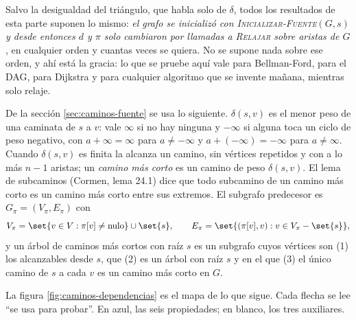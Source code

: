 \documentclass[11pt,letterpaper]{article}
\begin{document}
Salvo la desigualdad del triángulo, que habla solo de $\delta$, todos
los resultados de esta parte suponen lo mismo: \emph{el grafo se
inicializó con \textsc{Inicializar-Fuente}$(G, s)$ y desde entonces
$d$ y $\pi$ solo cambiaron por llamadas a \textsc{Relajar} sobre
aristas de $G$}, en cualquier orden y cuantas veces se quiera. No se
supone nada sobre ese orden, y ahí está la gracia: lo que se pruebe
aquí vale para Bellman-Ford, para el DAG, para Dijkstra y para
cualquier algoritmo que se invente mañana, mientras solo relaje.

De la sección \ref{sec:caminos-fuente} se usa lo siguiente.
$\delta(s, v)$ es el menor peso de una caminata de $s$ a $v$: vale
$\infty$ si no hay ninguna y $-\infty$ si alguna toca un ciclo de peso
negativo, con $a + \infty = \infty$ para $a \ne -\infty$ y
$a + (-\infty) = -\infty$ para $a \ne \infty$. Cuando $\delta(s, v)$ es
finita la alcanza un camino, sin vértices repetidos y con a lo más
$n - 1$ aristas; un \emph{camino más corto} es un camino de peso
$\delta(s, v)$. El lema de subcaminos (Cormen, lema 24.1) dice que todo
subcamino de un camino más corto es un camino más corto entre sus
extremos. El subgrafo predecesor es $G_\pi = (V_\pi, E_\pi)$ con
\[
  V_\pi = \set{v \in V : \pi[v] \ne \text{nulo}} \cup \set{s},
  \qquad
  E_\pi = \set{(\pi[v], v) : v \in V_\pi - \set{s}} ,
\]
y un árbol de caminos más cortos con raíz $s$ es un subgrafo cuyos
vértices son (1) los alcanzables desde $s$, que (2) es un árbol con
raíz $s$ y en el que (3) el único camino de $s$ a cada $v$ es un
camino más corto en $G$.

La figura \ref{fig:caminos-dependencias} es el mapa de lo que sigue.
Cada flecha se lee ``se usa para probar''. En azul, las seis
propiedades; en blanco, los tres auxiliares.
\end{document}
